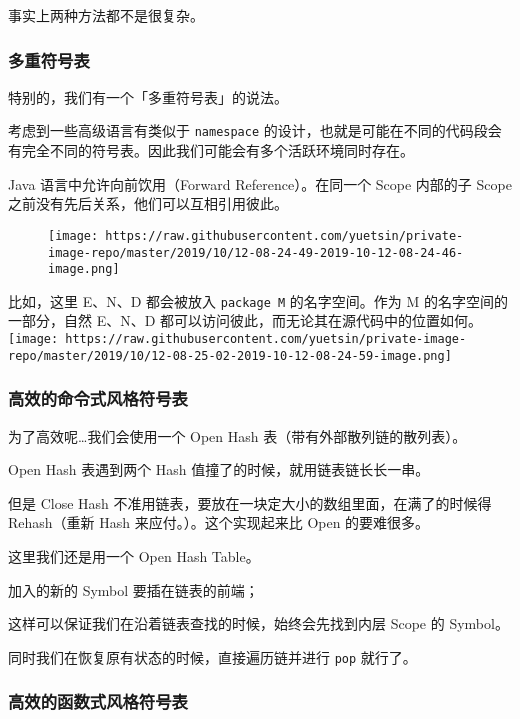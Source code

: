 \documentclass[
]{article}
\begin{document}
事实上两种方法都不是很复杂。

\hypertarget{header-n52}{%
\subsubsection{多重符号表}\label{header-n52}}

特别的，我们有一个「多重符号表」的说法。

考虑到一些高级语言有类似于 \texttt{namespace}
的设计，也就是可能在不同的代码段会有完全不同的符号表。因此我们可能会有多个活跃环境同时存在。

Java 语言中允许向前饮用（Forward Reference）。在同一个 Scope 内部的子
Scope 之前没有先后关系，他们可以互相引用彼此。

\begin{figure}
\centering
\texttt{[image: https://raw.githubusercontent.com/yuetsin/private-image-repo/master/2019/10/12-08-24-49-2019-10-12-08-24-46-image.png]}
\caption{}
\end{figure}

比如，这里 E、N、D 都会被放入 \texttt{package\ M} 的名字空间。作为 M
的名字空间的一部分，自然 E、N、D
都可以访问彼此，而无论其在源代码中的位置如何。\texttt{[image: https://raw.githubusercontent.com/yuetsin/private-image-repo/master/2019/10/12-08-25-02-2019-10-12-08-24-59-image.png]}

\hypertarget{header-n58}{%
\subsubsection{高效的命令式风格符号表}\label{header-n58}}

为了高效呢\ldots 我们会使用一个 Open Hash 表（带有外部散列链的散列表）。

Open Hash 表遇到两个 Hash 值撞了的时候，就用链表链长长一串。

但是 Close Hash 不准用链表，要放在一块定大小的数组里面，在满了的时候得
Rehash（重新 Hash 来应付。）。这个实现起来比 Open 的要难很多。

这里我们还是用一个 Open Hash Table。

加入的新的 Symbol 要插在链表的前端；

这样可以保证我们在沿着链表查找的时候，始终会先找到内层 Scope 的 Symbol。

同时我们在恢复原有状态的时候，直接遍历链并进行 \texttt{pop} 就行了。

\hypertarget{header-n66}{%
\subsubsection{高效的函数式风格符号表}\label{header-n66}}
\end{document}
